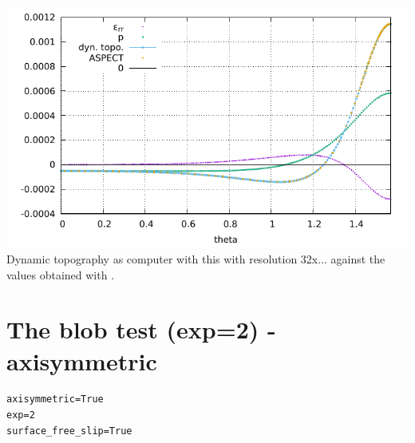 \begin{center}
\includegraphics[width=14cm]{python_codes/fieldstone_152/results/exp2/aspect/dynamic_topography.pdf}\\
{\captionfont Dynamic topography as computer with this \stone with resolution 32x... against the 
values obtained with \aspect.}
\end{center}

\newpage
\section*{The blob test (exp=2) - axisymmetric}

\begin{lstlisting}
axisymmetric=True
exp=2
surface_free_slip=True
\end{lstlisting}

